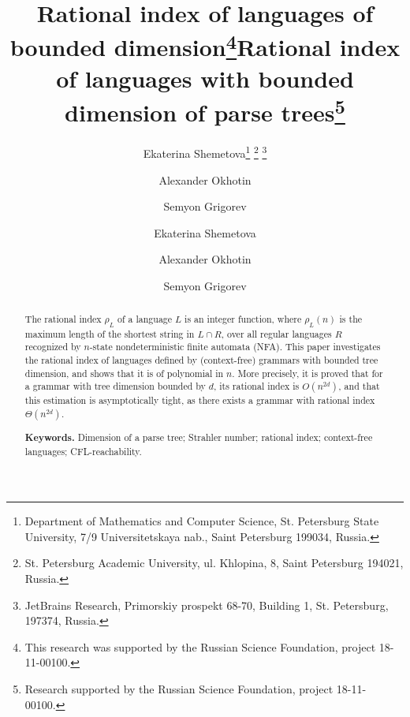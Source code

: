 \documentclass[runningheads]{llncs}
\begin{document}
\sloppy

\title{Rational index of languages of bounded dimension\footnote{%
This research was supported by the Russian Science Foundation, project 18-11-00100.}}

\author{Ekaterina Shemetova\footnote{%
Department of Mathematics and Computer Science, St. Petersburg State University, 
7/9 Universitetskaya nab., Saint Petersburg 199034, Russia.}
\footnote{%
St. Petersburg Academic University, 
ul. Khlopina, 8, Saint Petersburg 194021, Russia.}
\footnote{%
JetBrains Research,
Primorskiy prospekt 68-70, Building 1, St. Petersburg, 197374, Russia.}
\and
Alexander Okhotin\footnotemark[2]
\and
Semyon Grigorev\footnotemark[2] \footnotemark[4]
}

\title{Rational index of languages with bounded dimension of parse trees\thanks{%
	Research supported by the Russian Science Foundation, project 18-11-00100.}
}

\author{Ekaterina Shemetova
\and
Alexander Okhotin
\and
Semyon Grigorev
}




\maketitle


\begin{abstract}
The rational index $\rho_L$ of a language $L$ is an integer function,
where $\rho_L(n)$ is the maximum length of the shortest string in $L \cap R$,
over all regular languages $R$ recognized by $n$-state nondeterministic finite automata (NFA).
This paper investigates the rational index of languages
defined by (context-free) grammars with bounded tree dimension,
and shows that it is of polynomial in $n$.
More precisely, it is proved that for a grammar with tree dimension bounded by $d$,
its rational index is $O(n^{2d})$,
and that this estimation is asymptotically tight,
as there exists a grammar with rational index $\Theta(n^{2d})$.

\textbf{Keywords.}
Dimension of a parse tree; Strahler number; rational index; context-free languages; CFL-reachability.
\end{abstract}
\end{document}
